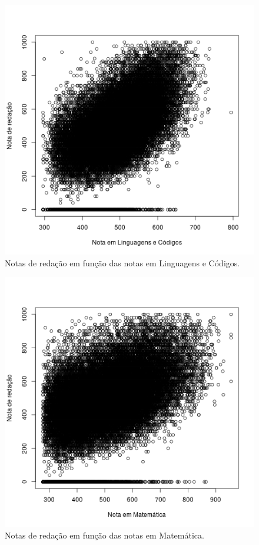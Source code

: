 \documentclass[12pt]{article}
\begin{document}
\begin{minipage}{.5\textwidth}
    \begin{figure}[H]
    \centering\includegraphics[width=.86\linewidth]{../correlacao_nota_lc.png}
    \caption{Notas de redação em função das notas em Linguagens e Códigos.}
    \label{fig:correlacao-nota-lc}
    \end{figure}
\end{minipage}%
\begin{minipage}{.5\textwidth}
    \begin{figure}[H]
    \centering\includegraphics[width=.86\linewidth]{../correlacao_nota_mt.png}
    \caption{Notas de redação em função das notas em Matemática.}
    \label{fig:correlacao-nota-mt}
    \end{figure}
\end{minipage}
\end{document}
